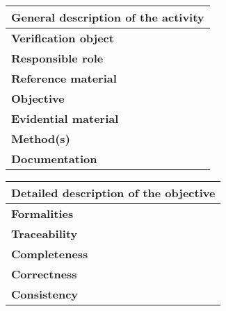 \begin{tabular}{|p{3.2cm}|p{11cm}|}
  \hline
  \multicolumn{2}{|c|}{\textbf{General description of the activity}} \\\hline
  \textbf{Verification object} & 
  \\\hline
  \textbf{Responsible role} & 
  \\\hline
  \textbf{Reference material} & 
  \\\hline
  \textbf{Objective} & 
  \\\hline
  \textbf{Evidential material} & 
  \\\hline
  \textbf{Method(s)} & 
  \\\hline
  \textbf{Documentation} & 
  \\\hline
\end{tabular}


\begin{tabular}{|p{3.2cm}|p{11cm}|}
  \hline
  \multicolumn{2}{|c|}{\textbf{Detailed description of the objective}} \\\hline
  \textbf{Formalities} & 
  \\\hline
  \textbf{Traceability} & 
  \\\hline
  \textbf{Completeness} & 
  \\\hline
  \textbf{Correctness} & 
  \\\hline
  \textbf{Consistency} & 
  \\\hline
\end{tabular}

